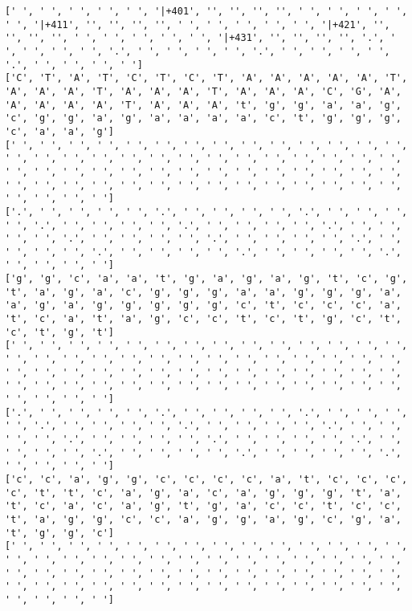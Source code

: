 \documentclass{article}
\begin{document}
\begin{Verbatim}
[' ', ' ', ' ', ' ', ' ', '|+401', '', '', '', '', ' ', ' ', ' ', ' ', ' ', '|+411', '', '', '', '', ' ', ' ', ' ', ' ', ' ', '|+421', '', '', '', '', ' ', ' ', ' ', ' ', ' ', '|+431', '', '', '', '', '.', ' ', ' ', ' ', ' ', '.', ' ', ' ', ' ', ' ', '.', ' ', ' ', ' ', ' ', '.', ' ', ' ', ' ', ' ']
['C', 'T', 'A', 'T', 'C', 'T', 'C', 'T', 'A', 'A', 'A', 'A', 'A', 'T', 'A', 'A', 'A', 'T', 'A', 'A', 'A', 'T', 'A', 'A', 'A', 'C', 'G', 'A', 'A', 'A', 'A', 'A', 'T', 'A', 'A', 'A', 't', 'g', 'g', 'a', 'a', 'g', 'c', 'g', 'g', 'a', 'g', 'a', 'a', 'a', 'a', 'c', 't', 'g', 'g', 'g', 'c', 'a', 'a', 'g']
[' ', ' ', ' ', ' ', ' ', ' ', ' ', ' ', ' ', ' ', ' ', ' ', ' ', ' ', ' ', ' ', ' ', ' ', ' ', ' ', ' ', ' ', ' ', ' ', ' ', ' ', ' ', ' ', ' ', ' ', ' ', ' ', ' ', ' ', ' ', ' ', ' ', ' ', ' ', ' ', ' ', ' ', ' ', ' ', ' ', ' ', ' ', ' ', ' ', ' ', ' ', ' ', ' ', ' ', ' ', ' ', ' ', ' ', ' ', ' ']
['.', ' ', ' ', ' ', ' ', '.', ' ', ' ', ' ', ' ', '.', ' ', ' ', ' ', ' ', '.', ' ', ' ', ' ', ' ', '.', ' ', ' ', ' ', ' ', '.', ' ', ' ', ' ', ' ', '.', ' ', ' ', ' ', ' ', '.', ' ', ' ', ' ', ' ', '.', ' ', ' ', ' ', ' ', '.', ' ', ' ', ' ', ' ', '.', ' ', ' ', ' ', ' ', '.', ' ', ' ', ' ', ' ']
['g', 'g', 'c', 'a', 'a', 't', 'g', 'a', 'g', 'a', 'g', 't', 'c', 'g', 't', 'a', 'g', 'a', 'c', 'g', 'g', 'g', 'a', 'a', 'g', 'g', 'g', 'a', 'a', 'g', 'a', 'g', 'g', 'g', 'g', 'g', 'c', 't', 'c', 'c', 'c', 'a', 't', 'c', 'a', 't', 'a', 'g', 'c', 'c', 't', 'c', 't', 'g', 'c', 't', 'c', 't', 'g', 't']
[' ', ' ', ' ', ' ', ' ', ' ', ' ', ' ', ' ', ' ', ' ', ' ', ' ', ' ', ' ', ' ', ' ', ' ', ' ', ' ', ' ', ' ', ' ', ' ', ' ', ' ', ' ', ' ', ' ', ' ', ' ', ' ', ' ', ' ', ' ', ' ', ' ', ' ', ' ', ' ', ' ', ' ', ' ', ' ', ' ', ' ', ' ', ' ', ' ', ' ', ' ', ' ', ' ', ' ', ' ', ' ', ' ', ' ', ' ', ' ']
['.', ' ', ' ', ' ', ' ', '.', ' ', ' ', ' ', ' ', '.', ' ', ' ', ' ', ' ', '.', ' ', ' ', ' ', ' ', '.', ' ', ' ', ' ', ' ', '.', ' ', ' ', ' ', ' ', '.', ' ', ' ', ' ', ' ', '.', ' ', ' ', ' ', ' ', '.', ' ', ' ', ' ', ' ', '.', ' ', ' ', ' ', ' ', '.', ' ', ' ', ' ', ' ', '.', ' ', ' ', ' ', ' ']
['c', 'c', 'a', 'g', 'g', 'c', 'c', 'c', 'c', 'a', 't', 'c', 'c', 'c', 'c', 't', 't', 'c', 'a', 'g', 'a', 'c', 'a', 'g', 'g', 'g', 't', 'a', 't', 'c', 'a', 'c', 'a', 'g', 't', 'g', 'a', 'c', 'c', 't', 'c', 'c', 't', 'a', 'g', 'g', 'c', 'c', 'a', 'g', 'g', 'a', 'g', 'c', 'g', 'a', 't', 'g', 'g', 'c']
[' ', ' ', ' ', ' ', ' ', ' ', ' ', ' ', ' ', ' ', ' ', ' ', ' ', ' ', ' ', ' ', ' ', ' ', ' ', ' ', ' ', ' ', ' ', ' ', ' ', ' ', ' ', ' ', ' ', ' ', ' ', ' ', ' ', ' ', ' ', ' ', ' ', ' ', ' ', ' ', ' ', ' ', ' ', ' ', ' ', ' ', ' ', ' ', ' ', ' ', ' ', ' ', ' ', ' ', ' ', ' ', ' ', ' ', ' ', ' ']

\end{Verbatim}
\end{document}
